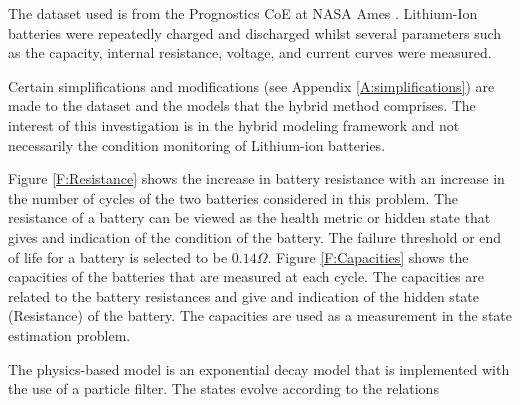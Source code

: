 






The dataset used is from the Prognostics CoE at NASA Ames \cite{Saha2007}. Lithium-Ion batteries were repeatedly charged and discharged whilst several parameters such as the capacity, internal resistance, voltage, and current curves were measured. 

Certain simplifications and modifications (see Appendix \ref{A:simplifications}) are made to the dataset and the models that the hybrid method comprises. The interest of this investigation is in the hybrid modeling framework and not necessarily the condition monitoring of Lithium-ion batteries. 

Figure \ref{F:Resistance} shows the increase in battery resistance with an increase in the number of cycles of the two batteries considered in this problem. The resistance of a battery can be viewed as the health metric or hidden state that gives and indication of the condition of the battery. The failure threshold or end of life for a battery is selected to be $0.14\Omega$. Figure \ref{F:Capacities} shows the capacities of the batteries that are measured at each cycle. The capacities are related to the battery resistances and give and indication of the hidden state (Resistance) of the battery. The capacities are used as a measurement in the state estimation problem. 

The physics-based model is an exponential decay model that is implemented with the use of a particle filter. The states evolve according to the relations 

